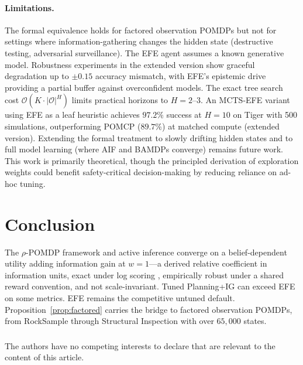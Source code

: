 \documentclass[runningheads]{llncs}
\begin{document}
\paragraph{Limitations.}
The formal equivalence holds for factored observation POMDPs but not for settings where information-gathering changes the hidden state (destructive testing, adversarial surveillance). The EFE agent assumes a known generative model. Robustness experiments in the extended version show graceful degradation up to $\pm 0.15$ accuracy mismatch, with EFE's epistemic drive providing a partial buffer against overconfident models. The exact tree search cost $\mathcal{O}(K \cdot |\mathcal{O}|^H)$ limits practical horizons to $H{=}2$--$3$. An MCTS-EFE variant using EFE as a leaf heuristic achieves $97.2\%$ success at $H{=}10$ on Tiger with 500 simulations, outperforming POMCP ($89.7\%$) at matched compute (extended version). Extending the formal treatment to slowly drifting hidden states and to full model learning (where AIF and BAMDPs converge) remains future work. This work is primarily theoretical, though the principled derivation of exploration weights could benefit safety-critical decision-making by reducing reliance on ad-hoc tuning.

\section{Conclusion}

The $\rho$-POMDP framework and active inference converge on a belief-dependent utility adding information gain at $w{=}1$---a derived relative coefficient in information units, exact under log scoring \citep{bernardo1979}, empirically robust under a shared reward convention, and not scale-invariant. Tuned Planning+IG can exceed EFE on some metrics. EFE remains the competitive untuned default. Proposition~\ref{prop:factored} carries the bridge to factored observation POMDPs, from RockSample through Structural Inspection with over $65{,}000$ states.

\begin{credits}
\subsubsection{\discintname}
The authors have no competing interests to declare that are relevant to the content of this article.
\end{credits}
\end{document}
